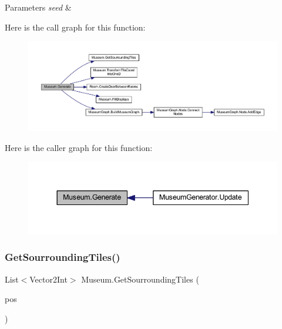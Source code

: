\begin{DoxyParams}{Parameters}
{\em seed} & \\
\hline
\end{DoxyParams}
Here is the call graph for this function\+:
\nopagebreak
\begin{figure}[H]
\begin{center}
\leavevmode
\includegraphics[width=350pt]{class_museum_a2a301b4e27f35da164ffa03b3d3d7e81_cgraph}
\end{center}
\end{figure}
Here is the caller graph for this function\+:
\nopagebreak
\begin{figure}[H]
\begin{center}
\leavevmode
\includegraphics[width=344pt]{class_museum_a2a301b4e27f35da164ffa03b3d3d7e81_icgraph}
\end{center}
\end{figure}
\mbox{\label{class_museum_af5b732fe3a0821d02852171a73cf8f8b}} 
\subsubsection{\texorpdfstring{Get\+Sourrounding\+Tiles()}{GetSourroundingTiles()}}
{\footnotesize\ttfamily List$<$Vector2\+Int$>$ Museum.\+Get\+Sourrounding\+Tiles (\begin{DoxyParamCaption}\item[{Vector2\+Int}]{pos }\end{DoxyParamCaption})\hspace{0.3cm}{\ttfamily [private]}}



